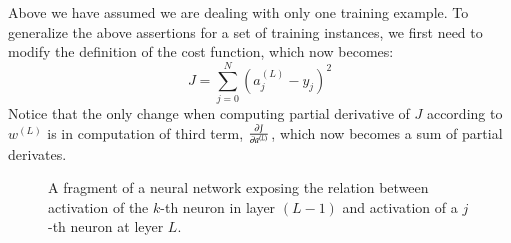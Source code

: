 \begin{refsection}
Above we have assumed we are dealing with only one training example. To generalize the above assertions for a set of training instances, we first need to modify the definition of the cost function, which now becomes:
\begin{equation}
J = \sum_{j=0}^N\left(a_j^{(L)}-y_j\right)^2
\end{equation}
Notice that the only change when computing partial derivative of $J$ according to $w^{(L)}$ is in computation of third term, $\frac{\partial J}{\partial a^{(L)}}$, which now becomes a sum of partial derivates.

\begin{figure}[htbp]
\caption{A fragment of a neural network exposing the relation between activation of the $k$-th neuron in layer $(L-1)$ and activation of a $j$-th neuron at leyer $L$.}
\label{fig:network-fragment}
\end{figure}


\end{refsection}
